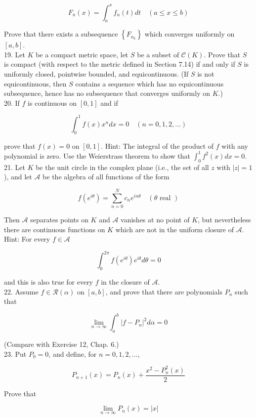 \documentclass[10pt]{article}
\begin{document}
$$
F_{n}(x)=\int_{a}^{x} f_{n}(t) d t \quad(a \leq x \leq b)
$$

Prove that there exists a subsequence $\left\{F_{n_{k}}\right\}$ which converges uniformly on $[a, b]$.\\
19. Let $K$ be a compact metric space, let $S$ be a subset of $\mathscr{C}(K)$. Prove that $S$ is compact (with respect to the metric defined in Section 7.14) if and only if $S$ is uniformly closed, pointwise bounded, and equicontinuous. (If $S$ is not equicontinuous, then $S$ contains a sequence which has no equicontinuous subsequence, hence has no subsequence that converges uniformly on $K$.)\\
20. If $f$ is continuous on $[0,1]$ and if

$$
\int_{0}^{1} f(x) x^{n} d x=0 \quad(n=0,1,2, \ldots)
$$

prove that $f(x)=0$ on $[0,1]$. Hint: The integral of the product of $f$ with any polynomial is zero. Use the Weierstrass theorem to show that $\int_{0}^{1} f^{2}(x) d x=0$.\\
21. Let $K$ be the unit circle in the complex plane (i.e., the set of all $z$ with $|z|=1$ ), and let $\mathscr{A}$ be the algebra of all functions of the form

$$
f\left(e^{i \theta}\right)=\sum_{n=0}^{N} c_{n} e^{i n \theta} \quad(\theta \text { real })
$$

Then $\mathscr{A}$ separates points on $K$ and $\mathscr{A}$ vanishes at no point of $K$, but nevertheless there are continuous functions on $K$ which are not in the uniform closure of $\mathscr{A}$. Hint: For every $f \in \mathscr{A}$

$$
\int_{0}^{2 \pi} f\left(e^{i \theta}\right) e^{i \theta} d \theta=0
$$

and this is also true for every $f$ in the closure of $\mathscr{A}$.\\
22. Assume $f \in \mathscr{R}(\alpha)$ on $[a, b]$, and prove that there are polynomials $P_{n}$ such that

$$
\lim _{n \rightarrow \infty} \int_{a}^{b}\left|f-P_{n}\right|^{2} d \alpha=0
$$

(Compare with Exercise 12, Chap. 6.)\\
23. Put $P_{0}=0$, and define, for $n=0,1,2, \ldots$,

$$
P_{n+1}(x)=P_{n}(x)+\frac{x^{2}-P_{n}^{2}(x)}{2}
$$

Prove that

$$
\lim _{n \rightarrow \infty} P_{n}(x)=|x|
$$
\end{document}
